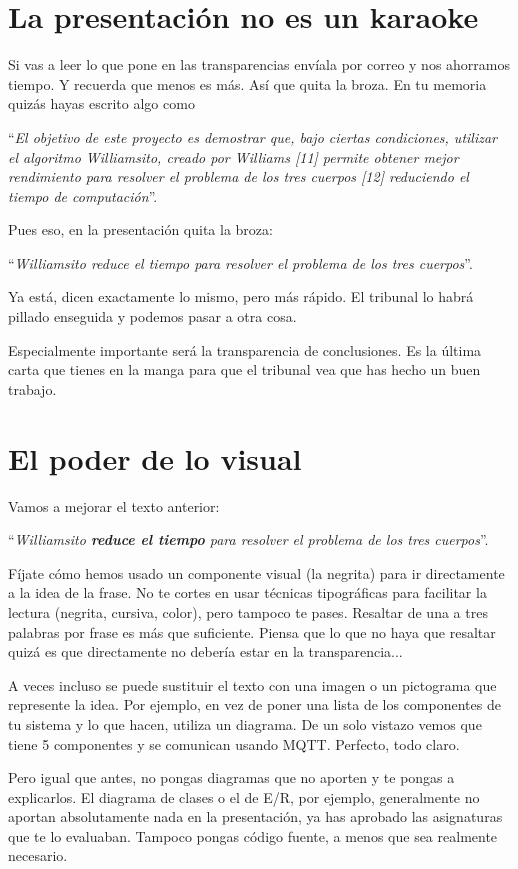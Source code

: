 \section{La presentación no es un karaoke}

Si vas a leer lo que pone en las transparencias envíala por correo y nos ahorramos tiempo. Y recuerda que menos es más. Así que quita la broza. En tu memoria quizás hayas escrito algo como 

``\textit{El objetivo de este proyecto es demostrar que, bajo ciertas condiciones, utilizar el algoritmo Williamsito, creado por Williams [11] permite obtener mejor rendimiento para resolver el problema de los tres cuerpos [12] reduciendo el tiempo de computación}''. 

Pues eso, en la presentación quita la broza: 

``\textit{Williamsito reduce el tiempo para resolver el problema de los tres cuerpos}''. 

Ya está, dicen exactamente lo mismo, pero más rápido. El tribunal lo habrá pillado enseguida y podemos pasar a otra cosa.

Especialmente importante será la transparencia de conclusiones. Es la última carta que tienes en la manga para que el tribunal vea que has hecho un buen trabajo.

\section{El poder de lo visual}
Vamos a mejorar el texto anterior: 

``\textit{Williamsito \textbf{reduce el tiempo} para resolver el problema de los tres cuerpos}''. 

Fíjate cómo hemos usado un componente visual (la negrita) para ir directamente a la idea de la frase. No te cortes en usar técnicas tipográficas para facilitar la lectura (negrita, cursiva, color), pero tampoco te pases. Resaltar de una a tres palabras por frase es más que suficiente. Piensa que lo que no haya que resaltar quizá es que directamente no debería estar en la transparencia...

A veces incluso se puede sustituir el texto con una imagen o un pictograma que represente la idea. Por ejemplo, en vez de poner una lista de los componentes de tu sistema y lo que hacen, utiliza un diagrama. De un solo vistazo vemos que tiene 5 componentes y se comunican usando MQTT. Perfecto, todo claro. 

Pero igual que antes, no pongas diagramas que no aporten y te pongas a explicarlos. El diagrama de clases o el de E/R, por ejemplo, generalmente no aportan absolutamente nada en la presentación, ya has aprobado las asignaturas que te lo evaluaban. Tampoco pongas código fuente, a menos que sea realmente necesario.

